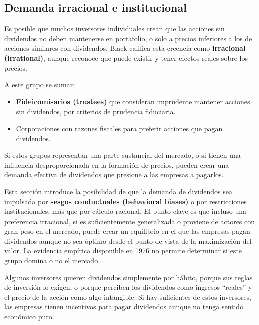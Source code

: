 \documentclass[12pt]{article}
\begin{document}
\subsection{Demanda irracional e institucional}

Es posible que muchos inversores individuales crean que las acciones sin dividendos no deben mantenerse en portafolio, o solo a precios inferiores a los de acciones similares con dividendos. Black califica esta creencia como \textbf{irracional (irrational)}, aunque reconoce que puede existir y tener efectos reales sobre los precios.

A este grupo se suman:
\begin{itemize}
  \item \textbf{Fideicomisarios (trustees)} que consideran imprudente mantener acciones sin dividendos, por criterios de prudencia fiduciaria.
  \item Corporaciones con razones fiscales para preferir acciones que pagan dividendos.
\end{itemize}

Si estos grupos representan una parte sustancial del mercado, o si tienen una influencia desproporcionada en la formaci\'on de precios, pueden crear una demanda efectiva de dividendos que presione a las empresas a pagarlos.

\begin{explicacion}
Esta secci\'on introduce la posibilidad de que la demanda de dividendos sea impulsada por \textbf{sesgos conductuales (behavioral biases)} o por restricciones institucionales, m\'as que por c\'alculo racional. El punto clave es que incluso una preferencia irracional, si es suficientemente generalizada o proviene de actores con gran peso en el mercado, puede crear un equilibrio en el que las empresas pagan dividendos aunque no sea \'optimo desde el punto de vista de la maximizaci\'on del valor. La evidencia emp\'irica disponible en 1976 no permite determinar si este grupo domina o no el mercado.
\end{explicacion}

\begin{intuicion}
Algunos inversores quieren dividendos simplemente por h\'abito, porque sus reglas de inversi\'on lo exigen, o porque perciben los dividendos como ingresos ``reales'' y el precio de la acci\'on como algo intangible. Si hay suficientes de estos inversores, las empresas tienen incentivos para pagar dividendos aunque no tenga sentido econ\'omico puro.
\end{intuicion}
\end{document}
